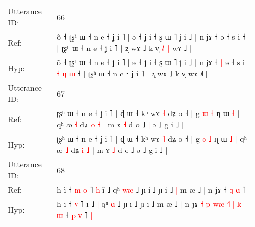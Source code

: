 \documentclass[10pt]{article}
\DeclareRobustCommand{\hl}[1]{{\textcolor{red}{#1}}}
\begin{document}
\begin{longtable}{ll}
 \\
\midrule
Utterance ID: & 66 \\
Ref: & õ ˧ ʈʂʰ ɯ ˧ n e ˧ ʝ i ˥ | ə ˧ ʝ i ˧ ʂ ɯ ˥ ʝ i ˩ | n jɤ ˧\hl{}\hl{} ə ˧ s i\hl{}\hl{}\hl{}\hl{}\hl{}\hl{} ˧ | ʈʂʰ ɯ ˧ n e ˧ ʝ i ˥ | ʐ wɤ ˩ k v̩\hl{ }\hl{˩}\hl{˥}\hl{ }\hl{|} wɤ ˩\hl{} |
 \\
Hyp: & õ ˧ ʈʂʰ ɯ ˧ n e ˧ ʝ i ˥ | ə ˧ ʝ i ˧ ʂ ɯ ˥ ʝ i ˩ | n jɤ ˧\hl{ }\hl{|} ə ˧ s i\hl{ }\hl{˧}\hl{ }\hl{ɳ}\hl{ }\hl{ɯ} ˧ | ʈʂʰ ɯ ˧ n e ˧ ʝ i ˥ | ʐ wɤ ˩ k v̩\hl{}\hl{}\hl{}\hl{}\hl{} wɤ ˩\hl{˥} |
 \\
\midrule
Utterance ID: & 67 \\
Ref: & ʈʂʰ ɯ ˧ n e ˧ ʝ i ˥ | ɖ ɯ ˧ kʰ wɤ \hl{˧} dʑ o ˧ | g \hl{ɯ} \hl{˧} ɳ ɯ \hl{˧} | qʰ æ \hl{˧} dʑ \hl{o} \hl{˧} | m ɤ \hl{˧} d o ˩\hl{ }\hl{|} ə ˩ g i ˩ |
 \\
Hyp: & ʈʂʰ ɯ ˧ n e ˧ ʝ i ˥ | ɖ ɯ ˧ kʰ wɤ \hl{˥} dʑ o ˧ | g \hl{o} \hl{˩} ɳ ɯ \hl{˩} | qʰ æ \hl{˩} dʑ \hl{i} \hl{˩} | m ɤ \hl{˩} d o ˩\hl{}\hl{} ə ˩ g i ˩ |
 \\
\midrule
Utterance ID: & 68 \\
Ref: & h ĩ ˧ \hl{m}\hl{ }\hl{o} ˥\hl{ }\hl{h} ĩ ˩\hl{}\hl{} qʰ \hl{w}\hl{æ} ˩ ɲ i ˩ ɲ i ˩\hl{ }\hl{|} m æ ˩ | n jɤ\hl{}\hl{}\hl{}\hl{}\hl{}\hl{}\hl{}\hl{}\hl{}\hl{}\hl{}\hl{}\hl{}\hl{}\hl{}\hl{} ˧ \hl{q} \hl{}\hl{ɑ} ˥\hl{}\hl{}
 \\
Hyp: & h ĩ ˧ \hl{}\hl{v}\hl{̩} ˥\hl{}\hl{} ĩ ˩\hl{ }\hl{|} qʰ \hl{}\hl{ɑ} ˩ ɲ i ˩ ɲ i ˩\hl{}\hl{} m æ ˩ | n jɤ\hl{ }\hl{˧}\hl{ }\hl{p}\hl{ }\hl{w}\hl{æ}\hl{ }\hl{˧}\hl{˥}\hl{ }\hl{|}\hl{ }\hl{k}\hl{ }\hl{ɯ} ˧ \hl{p} \hl{v}\hl{̩} ˥\hl{ }\hl{|}
 \\
\midrule
\end{longtable}
\end{document}
